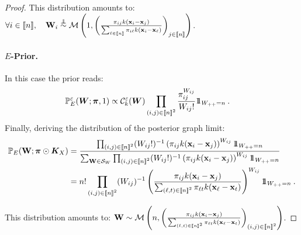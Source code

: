 \begin{proof}
This distribution amounts to: $\forall i \in \integ{n}, \quad \W_{i} \stackrel{\perp\!\!\!\!\perp}{\sim} \mathcal{M}\left(1, \left(\frac{\pi_{ij} k(\mathbf{x}_i - \mathbf{x}_j)}{\sum_{\ell \in \integ{n}} \pi_{i\ell} k(\mathbf{x}_i - \mathbf{x}_{\ell})}\right)_{j \in \integ{n}}\right)$.

\paragraph{$E$-Prior.}
In this case the prior reads:
\begin{align*}
    \mathbb{P}_{E}^{\varepsilon}(\bm{W}; \bm{\pi}, 1) &\propto \mathcal{C}_{k}^{\varepsilon}(\bm{W}) \prod_{(i,j) \in {[\![n]\!]}^2} \frac{\pi_{ij}^{W_{ij}}}{W_{ij}!} 1\!\!1_{W_{++} = n} \:.
\end{align*}
Finally, deriving the distribution of the posterior graph limit:
\begin{align*}
    \mathbb{P}_{E}(\W ;\bm{\pi} \odot \bm{K}_{X}) &= \frac{\prod_{(i,j) \in \integ{n}^2}  (W_{ij}!)^{-1}\left(\pi_{ij} k(\mathbf{x}_i - \mathbf{x}_j)\right)^{W_{ij}} \ind_{W_{++} = n}}{\sum_{\W \in \mathcal{S}_{W}} \prod_{(i,j) \in \integ{n}^2} (W_{ij}!)^{-1} \left(\pi_{ij} k(\mathbf{x}_i - \mathbf{x}_j)\right)^{W_{ij}} \ind_{W_{++} = n}} \\
    &= n! \prod_{(i,j) \in \integ{n}^2} (W_{ij})^{-1} \left(\frac{\pi_{ij} k(\mathbf{x}_i - \mathbf{x}_j)}{\sum_{(\ell,t) \in \integ{n}^2} \pi_{\ell t} k(\mathbf{x}_{\ell} - \mathbf{x}_t)}\right)^{W_{ij}} \ind_{W_{++} = n} \:.
\end{align*}

This distribution amounts to: $\mathbf{W} \sim \mathcal{M}\left(n, \left(\frac{\pi_{ij} k(\mathbf{x}_i - \mathbf{x}_j)}{\sum_{(\ell,t) \in {[\![n]\!]}^2} \pi_{\ell t} k(\mathbf{x}_{\ell} - \mathbf{x}_t)}\right)_{(i,j) \in {[\![n]\!]}^2}\right)$.
\end{proof}